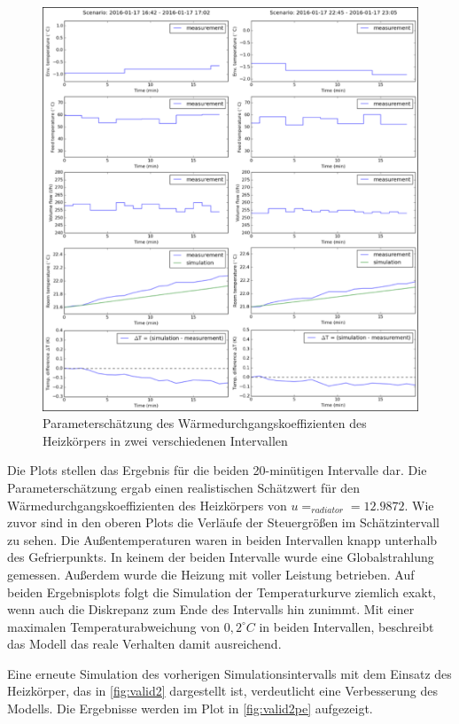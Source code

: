 \begin{figure}
\centering
\includegraphics[width=\textwidth]{abbildungen/20160329_pestep3}
\caption{Parameterschätzung des Wärmedurchgangskoeffizienten des Heizkörpers in zwei verschiedenen Intervallen}
\label{fig:step3}
\end{figure}

Die Plots stellen das Ergebnis für die beiden 20-minütigen Intervalle dar. Die Parameterschätzung ergab einen realistischen Schätzwert für den Wärmedurchgangskoeffizienten des Heizkörpers von $u=_{radiator}=12.9872$.
Wie zuvor sind in den oberen Plots die Verläufe der Steuergrößen im Schätzintervall zu sehen. Die Außentemperaturen waren in beiden Intervallen knapp unterhalb des Gefrierpunkts. In keinem der beiden Intervalle wurde eine Globalstrahlung gemessen. Außerdem wurde die Heizung mit voller Leistung betrieben.
Auf beiden Ergebnisplots folgt die Simulation der Temperaturkurve ziemlich exakt, wenn auch die Diskrepanz zum Ende des Intervalls hin zunimmt. Mit einer maximalen Temperaturabweichung von $0,2^{\circ}C$ in beiden Intervallen, beschreibt das Modell das reale Verhalten damit ausreichend.

Eine erneute Simulation des vorherigen Simulationsintervalls mit dem Einsatz des Heizkörper, das in \ref{fig:valid2} dargestellt ist, verdeutlicht eine Verbesserung des Modells. Die Ergebnisse werden im Plot in \ref{fig:valid2pe} aufgezeigt.

